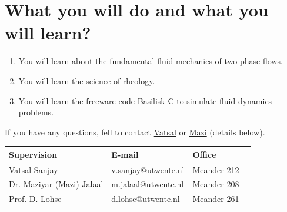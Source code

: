 \documentclass[a4paper,10pt]{article}
\begin{document}
\section*{What you will do and what you will learn?}
\begin{enumerate}
\item You will learn about the fundamental fluid mechanics of two-phase flows.
\item You will learn the science of rheology.
\item You will learn the freeware code \href{http://basilisk.fr}{Basilisk C} to simulate fluid dynamics problems.
\end{enumerate}
If you have any questions, fell to contact \href{mailto:v.sanjay@utwente.nl}{Vatsal} or \href{mailto:m.jalaal@utwente.nl}{Mazi} (details below).
\begin{center}
\begin{tabular}{|l|l|l|l|}
\hline \textbf{Supervision} & \textbf{E-mail} & \textbf{Office} \\
\hline Vatsal Sanjay & \href{mailto:v.sanjay@utwente.nl}{v.sanjay@utwente.nl} & Meander 212 \\
\hline Dr. Maziyar (Mazi) Jalaal   & \href{mailto:m.jalaal@utwente.nl}{m.jalaal@utwente.nl}& Meander 208 \\
\hline Prof. D. Lohse & \href{mailto:d.lohse@utwente.nl}{d.lohse@utwente.nl} & Meander 261  \\
\hline
\end{tabular}
\end{center}
\printbibliography
\end{document}
